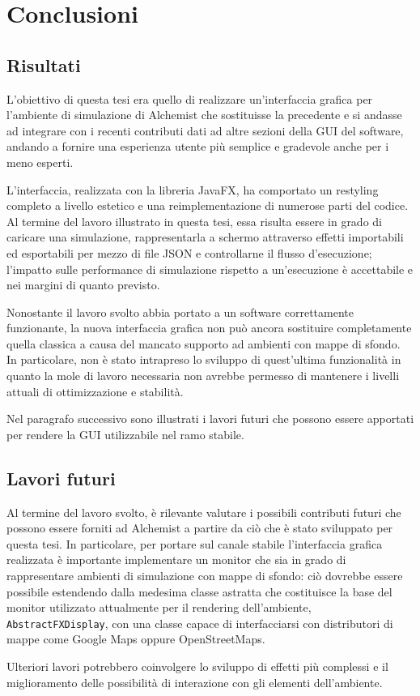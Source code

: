 
\chapter{Conclusioni}\label{ch:conclusioni}
    \section{Risultati}\label{sec:risultati}
        L'obiettivo di questa tesi era quello di realizzare un'interfaccia grafica per l'ambiente di simulazione di Alchemist che sostituisse la precedente e si andasse ad integrare con i recenti contributi dati ad altre sezioni della GUI del software, andando a fornire una esperienza utente più semplice e gradevole anche per i meno esperti.

        L'interfaccia, realizzata con la libreria JavaFX, ha comportato un restyling completo a livello estetico e una reimplementazione di numerose parti del codice.
        Al termine del lavoro illustrato in questa tesi, essa risulta essere in grado di caricare una simulazione, rappresentarla a schermo attraverso effetti importabili ed esportabili per mezzo di file JSON e controllarne il flusso d'esecuzione;
        l'impatto sulle performance di simulazione rispetto a un'esecuzione  è accettabile e nei margini di quanto previsto.

        Nonostante il lavoro svolto abbia portato a un software correttamente funzionante, la nuova interfaccia grafica non può ancora sostituire completamente quella classica a causa del mancato supporto ad ambienti con mappe di sfondo.
        In particolare, non è stato intrapreso lo sviluppo di quest'ultima funzionalità in quanto la mole di lavoro necessaria non avrebbe permesso di mantenere i livelli attuali di ottimizzazione e stabilità.

        Nel paragrafo successivo sono illustrati i lavori futuri che possono essere apportati per rendere la GUI utilizzabile nel ramo stabile.

    \section{Lavori futuri}\label{sec:futuro}
        Al termine del lavoro svolto, è rilevante valutare i possibili contributi futuri che possono essere forniti ad Alchemist a partire da ciò che è stato sviluppato per questa tesi.
        In particolare, per portare sul canale stabile l'interfaccia grafica realizzata è importante implementare un monitor che sia in grado di rappresentare ambienti di simulazione con mappe di sfondo: ciò dovrebbe essere possibile estendendo dalla medesima classe astratta che costituisce la base del monitor utilizzato attualmente per il rendering dell'ambiente, \texttt{AbstractFXDisplay}, con una classe capace di interfacciarsi con distributori di mappe come Google Maps oppure OpenStreetMaps.

        Ulteriori lavori potrebbero coinvolgere lo sviluppo di effetti più complessi e il miglioramento delle possibilità di interazione con gli elementi dell'ambiente.
